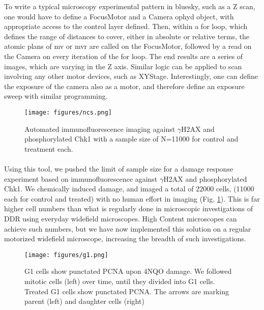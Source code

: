 To write a typical microscopy experimental pattern in bluesky, such as a Z scan, one would have to define a FocusMotor and a Camera ophyd object, with appropriate access to the control layer defined. Then, within a for loop, which defines the range of distances to cover, either in absolute or relative terms, the atomic plans of mv or mvr are called on the FocusMotor, followed by a read on the Camera on every iteration of the for loop. The end results are a series of images, which are varying in the Z axis. Similar logic can be applied to scan involving any other motor devices, such as XYStage. Interestingly, one can define the exposure of the camera also as a motor, and therefore define an exposure sweep with similar programming.


\begin{figure}[H]
    {\hfill\texttt{[image: figures/ncs.png]}\hspace*{\fill}}
    \caption{Automated immunofluorescence imaging against $\gamma$H2AX and phosphorylated Chk1 with a sample size of N=11000 for control and treatment each.}
    {\label{fig:ncs}}
\end{figure}

\paragraph*{} Using this tool, we pushed the limit of sample size for a damage response experiment based on immunofluorescence against $\gamma$H2AX and phosphorylated Chk1. We chemically induced damage, and imaged a total of 22000 cells, (11000 each for control and treated) with no human effort in imaging (Fig. \ref{fig:ncs}). This is far higher cell numbers than what is regularly done in microscopic investigations of DDR using everyday widefield microscopes. High Content microscopes can achieve such numbers, but we have now implemented this solution on a regular motorized widefield microscope, increasing the breadth of such investigations.

\begin{figure}[H]
    {\hfill\texttt{[image: figures/g1.png]}\hspace*{\fill}}
    \caption{G1 cells show punctated PCNA upon 4NQO damage. We followed mitotic cells (left) over time, until they divided into G1 cells. Treated G1 cells show punctated PCNA. The arrows are marking parent (left) and daughter cells (right)}
    {\label{fig:g1}}
\end{figure}

